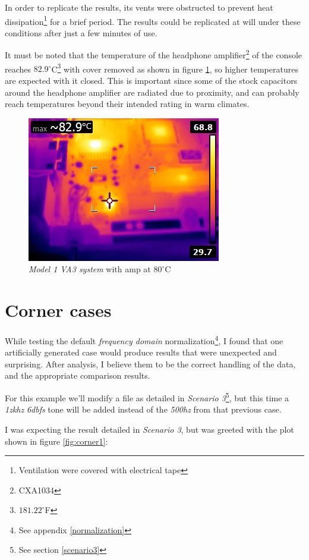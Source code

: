 \documentclass[10pt,a4paper]{report}
\newcommand{\fhz}[1]{\textit{#1\acrshort{hz}}}
\newcommand{\fkhz}[1]{\textit{#1\acrshort{khz}}}
\newcommand{\db}[1]{\textit{#1\acrshort{dbfs}}}
\begin{document}
\begin{appendices}
In order to replicate the results, its vents were obstructed to prevent heat dissipation\footnote{Ventilation were covered with electrical tape} for a brief period. The results could be replicated at will under these conditions after just a few minutes of use.

It must be noted that the temperature of the headphone amplifier\footnote{CXA1034} of the console reaches $82.9^\circ$C\footnote{$181.22^\circ$F} with cover removed as shown in figure \ref{fig:heathigh}, so higher temperatures are expected with it closed. This is important since some of the stock capacitors around the headphone amplifier are radiated due to proximity, and can probably reach temperatures beyond their intended rating in warm climates.

\begin{figure}[H]
	\centering
	\includegraphics[width=0.4\linewidth]{images/heat/2-hot.jpg}
	\caption[Hot Console]{\textit{Model 1 VA3 system} with amp at $80^\circ$C}
	\label{fig:heathigh}
\end{figure}

\chapter{Corner cases}
\label{cornercase}

While testing the default\textit{ frequency domain} normalization\footnote{See appendix \ref{normalization}}, I found that one artificially generated case would produce results that were unexpected and surprising. After analysis, I believe them to be the correct handling of the data, and the appropriate comparison results.

For this example we'll modify a file as detailed in \textit{Scenario 3}\footnote{See section \ref{scenario3}}, but this time a \fkhz{1z} \db{6} tone will be added instead of the \fhz{500} from that previous case.

I was expecting the result detailed in \textit{Scenario 3}, but was greeted with the plot shown in figure \ref{fig:corner1}:


\end{appendices}
\end{document}
